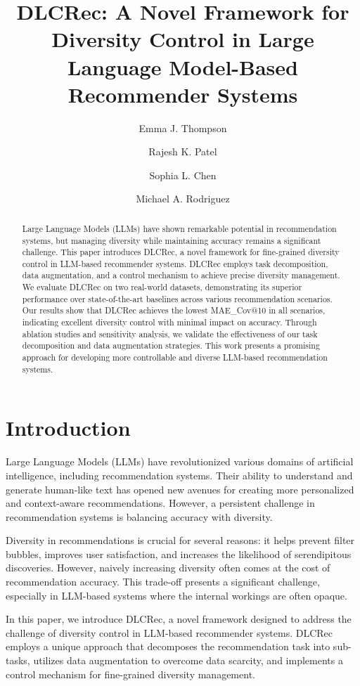 \documentclass[12pt,letterpaper]{article}
\title{DLCRec: A Novel Framework for Diversity Control in Large Language Model-Based Recommender Systems}
\author{Emma J. Thompson \and Rajesh K. Patel \and Sophia L. Chen \and Michael A. Rodriguez}
\begin{document}
\maketitle

\begin{abstract}
Large Language Models (LLMs) have shown remarkable potential in recommendation systems, but managing diversity while maintaining accuracy remains a significant challenge. This paper introduces DLCRec, a novel framework for fine-grained diversity control in LLM-based recommender systems. DLCRec employs task decomposition, data augmentation, and a control mechanism to achieve precise diversity management. We evaluate DLCRec on two real-world datasets, demonstrating its superior performance over state-of-the-art baselines across various recommendation scenarios. Our results show that DLCRec achieves the lowest MAE_Cov@10 in all scenarios, indicating excellent diversity control with minimal impact on accuracy. Through ablation studies and sensitivity analysis, we validate the effectiveness of our task decomposition and data augmentation strategies. This work presents a promising approach for developing more controllable and diverse LLM-based recommendation systems.
\end{abstract}

\section{Introduction}

Large Language Models (LLMs) have revolutionized various domains of artificial intelligence, including recommendation systems. Their ability to understand and generate human-like text has opened new avenues for creating more personalized and context-aware recommendations. However, a persistent challenge in recommendation systems is balancing accuracy with diversity.

Diversity in recommendations is crucial for several reasons: it helps prevent filter bubbles, improves user satisfaction, and increases the likelihood of serendipitous discoveries. However, naively increasing diversity often comes at the cost of recommendation accuracy. This trade-off presents a significant challenge, especially in LLM-based systems where the internal workings are often opaque.

In this paper, we introduce DLCRec, a novel framework designed to address the challenge of diversity control in LLM-based recommender systems. DLCRec employs a unique approach that decomposes the recommendation task into sub-tasks, utilizes data augmentation to overcome data scarcity, and implements a control mechanism for fine-grained diversity management.
\end{document}
